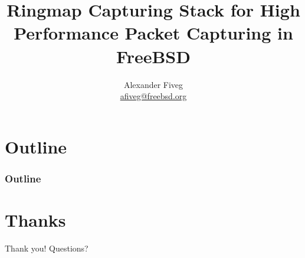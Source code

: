\documentclass{beamer}
\title{Ringmap Capturing Stack for High Performance Packet Capturing in FreeBSD}
\author[Alexander Fiveg]{ Alexander Fiveg \\
\url{afiveg@freebsd.org} }
\begin{document}
\frame{\titlepage}


\section*{Outline}
\begin{frame}
\frametitle{Outline}
\tableofcontents
\end{frame}











\section*{Thanks}
\begin{frame}
	\begin{center}
	\huge{Thank you! Questions?}
	\end{center}
\end{frame}
\end{document}
